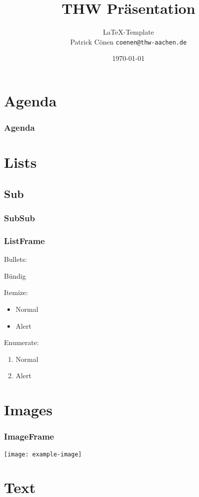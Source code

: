 \documentclass{beamer}
\title{THW Präsentation}
\author{\LaTeX-Template\\Patrick Cönen \texttt{coenen@thw-aachen.de}}
\date{\today}
\begin{document}
\begin{frame}
  \titlepage
\end{frame}

\section*{Agenda}
\begin{frame}
  \frametitle{Agenda}
  \tableofcontents
\end{frame}

\section{Lists}
\subsection{Sub}
\subsubsection{SubSub}

\begin{frame}
  \frametitle{ListFrame}
  Bullets:
  \begin{bullets}
    \item{Bündig}
  \end{bullets}
  Itemize:
  \begin{itemize}
    \item{Normal}
    \item<alert@1>{Alert}
  \end{itemize}
  Enumerate:
  \begin{enumerate}
    \item{Normal}
    \item<alert@1>{Alert}
  \end{enumerate}
\end{frame}

\section{Images}

\begin{frame}
  \frametitle{ImageFrame}
  \centering
  \texttt{[image: example-image]}
\end{frame}

\section{Text}
\end{document}
